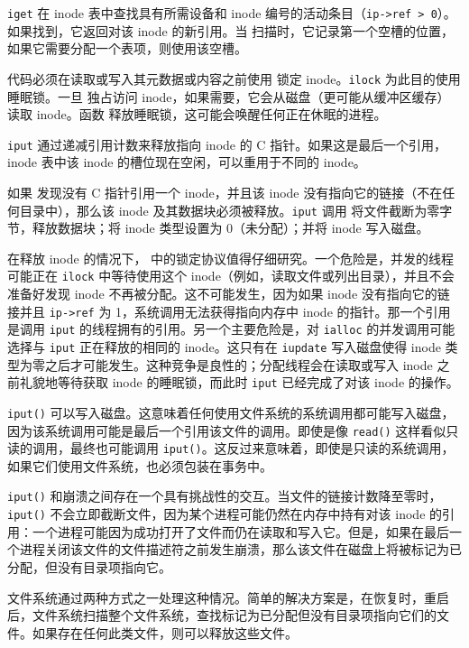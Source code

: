 \lstinline{iget} 在 inode 表中查找具有所需设备和 inode 编号的活动条目（\lstinline{ip->ref > 0}）。如果找到，它返回对该 inode 的新引用。当  扫描时，它记录第一个空槽的位置，如果它需要分配一个表项，则使用该空槽。

代码必须在读取或写入其元数据或内容之前使用  锁定 inode。\lstinline{ilock} 为此目的使用睡眠锁。一旦  独占访问 inode，如果需要，它会从磁盘（更可能从缓冲区缓存）读取 inode。函数  释放睡眠锁，这可能会唤醒任何正在休眠的进程。

\lstinline{iput} 通过递减引用计数来释放指向 inode 的 C 指针。如果这是最后一个引用，inode 表中该 inode 的槽位现在空闲，可以重用于不同的 inode。

如果  发现没有 C 指针引用一个 inode，并且该 inode 没有指向它的链接（不在任何目录中），那么该 inode 及其数据块必须被释放。\lstinline{iput} 调用  将文件截断为零字节，释放数据块；将 inode 类型设置为 0（未分配）；并将 inode 写入磁盘。

在释放 inode 的情况下， 中的锁定协议值得仔细研究。一个危险是，并发的线程可能正在 \lstinline{ilock} 中等待使用这个 inode（例如，读取文件或列出目录），并且不会准备好发现 inode 不再被分配。这不可能发生，因为如果 inode 没有指向它的链接并且 \lstinline{ip->ref} 为 1，系统调用无法获得指向内存中 inode 的指针。那一个引用是调用 \lstinline{iput} 的线程拥有的引用。另一个主要危险是，对 \lstinline{ialloc} 的并发调用可能选择与 \lstinline{iput} 正在释放的相同的 inode。这只有在 \lstinline{iupdate} 写入磁盘使得 inode 类型为零之后才可能发生。这种竞争是良性的；分配线程会在读取或写入 inode 之前礼貌地等待获取 inode 的睡眠锁，而此时 \lstinline{iput} 已经完成了对该 inode 的操作。

\lstinline{iput()} 可以写入磁盘。这意味着任何使用文件系统的系统调用都可能写入磁盘，因为该系统调用可能是最后一个引用该文件的调用。即使是像 \lstinline{read()} 这样看似只读的调用，最终也可能调用 \lstinline{iput()}。这反过来意味着，即使是只读的系统调用，如果它们使用文件系统，也必须包装在事务中。

\lstinline{iput()} 和崩溃之间存在一个具有挑战性的交互。当文件的链接计数降至零时，\lstinline{iput()} 不会立即截断文件，因为某个进程可能仍然在内存中持有对该 inode 的引用：一个进程可能因为成功打开了文件而仍在读取和写入它。但是，如果在最后一个进程关闭该文件的文件描述符之前发生崩溃，那么该文件在磁盘上将被标记为已分配，但没有目录项指向它。

文件系统通过两种方式之一处理这种情况。简单的解决方案是，在恢复时，重启后，文件系统扫描整个文件系统，查找标记为已分配但没有目录项指向它们的文件。如果存在任何此类文件，则可以释放这些文件。

